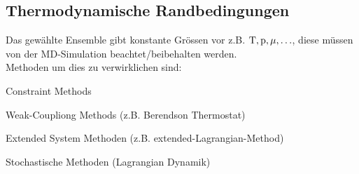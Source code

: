\subsection{Thermodynamische Randbedingungen}
\begin{sectionbox}\nospacing
  Das gewählte Ensemble gibt konstante  Grössen vor z.B. $\mathrm{T},\mathrm{p},\mathrm{\mu},\ldots$, diese müssen von der MD-Simulation beachtet/beibehalten werden.\\
  Methoden um dies zu verwirklichen sind:
  \begin{circlelist}
      \item Constraint Methods
      \item Weak-Coupliong Methods (z.B. Berendson Thermostat)
      \item Extended System Methoden (z.B. extended-Lagrangian-Method)
      \item Stochastische Methoden (Lagrangian Dynamik)
  \end{circlelist}
\end{sectionbox}
	\vfill\columnbreak

